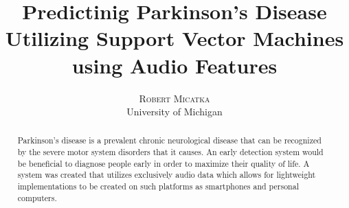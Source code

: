 \documentclass[twoside]{article}
\title{\vspace{-15mm}\fontsize{14pt}{12pt}\selectfont\textbf{Predictinig Parkinson's Disease Utilizing Support Vector Machines using Audio Features}} %
\author{
\large
\textsc{Robert Micatka}\\ %
\normalsize University of Michigan \\ %
}
\begin{document}
\maketitle 

\date{}


\begin{abstract}

	Parkinson's disease is a prevalent chronic neurological disease that can be recognized by the severe
motor system disorders that it causes. An early detection system would be beneficial to diagnose people
early in order to maximize their quality of life. A system was created that utilizes exclusively audio
data which allows for lightweight implementations to be created on such platforms as smartphones and personal computers.
 
\end{abstract}

\end{document}
